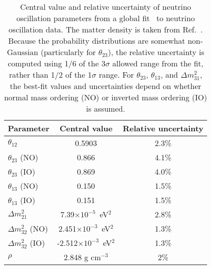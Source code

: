 \begin{table}[htbp]
    \centering
    \begin{tabular}{lcc}
      \hline
 Parameter &    Central value & Relative uncertainty \\
\hline\hline
$\theta_{12}$ & 0.5903 & 2.3\% \\ \hline
$\theta_{23}$ (NO) & 0.866  & 4.1\% \\ 
$\theta_{23}$ (IO) & 0.869  & 4.0\% \\ \hline
$\theta_{13}$ (NO) & 0.150  & 1.5\% \\ 
$\theta_{13}$ (IO) & 0.151  & 1.5\% \\ \hline
$\Delta m^2_{21}$ & 7.39$\times10^{-5}$~eV$^2$ & 2.8\% \\ \hline
$\Delta m^2_{32}$ (NO) & 2.451$\times10^{-3}$~eV$^2$ &  1.3\% \\
$\Delta m^2_{32}$ (IO) & -2.512$\times10^{-3}$~eV$^2$ &  1.3\% \\
\hline
$\rho$ & 2.848 g cm$^{-3}$ & 2\% \\
\hline
    \end{tabular}
    \caption[Parameter values and uncertainties from a global fit to neutrino oscillation data]{Central value and relative uncertainty of neutrino oscillation parameters from a global fit~\cite{Esteban:2018azc,nufitweb} to neutrino oscillation data. The matter density is taken from Ref.~\cite{Roe:2017zdw}. Because the probability distributions are somewhat non-Gaussian (particularly for $\theta_{23}$), the relative uncertainty is computed using 1/6 of the 3$\sigma$ allowed range from the fit, rather than 1/2 of the 1$\sigma$ range. For $\theta_{23}$, $\theta_{13}$, and $\Delta m^2_{31}$, the best-fit values and uncertainties depend on whether normal mass ordering (NO) or inverted mass ordering (IO) is assumed.}
    \label{tab:oscpar_nufit}
\end{table}
